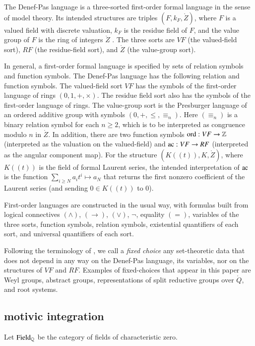 The Denef-Pas language is a three-sorted first-order formal language in the sense of model theory.  
Its intended structures are triples $(F,k_F,\ring{Z})$, 
where $F$ is a valued field with discrete valuation, 
$k_F$ is the residue field of $F$, 
and the value group of $F$ is the ring of integers $\ring{Z}$ . 
The three sorts are $VF$ (the valued-field sort), $RF$ (the residue-field sort), and $\ring{Z}$ (the value-group sort).

In general, a first-order formal language is specified by sets of relation symbols and function symbols.
The Denef-Pas language has the following relation and function symbols.  
The valued-field sort $VF$ has the symbols of the first-order language of rings $(0,1,+,\times)$.  
The residue field sort also has the symbols of the first-order language of rings.  
The value-group sort is the Presburger language of an ordered additive group with symbols $(0,+,\le,\equiv_n)$.  
Here $(\equiv_n)$ is a binary relation symbol for each $n\ge 2$, which is to be interpreted as congruence modulo $n$ in $\ring{Z}$.
In addition, there are two function symbols ${\operatorname{ord}}:VF\to\mathbb{Z}$ (interpreted as the valuation on the valued-field) and ${\operatorname{ac}}:VF\to RF$ 
(interpreted as the angular component map).  
For the structure $(K((t)),K,\ring{Z})$, where $K((t))$ is the field of formal Laurent series, 
the intended interpretation of ${\operatorname{ac}}$ 
is the function $\sum_{i\ge N} a_i t^i\mapsto a_N$ 
that returns the first nonzero coefficient of the Laurent series (and sending $0\in K((t))$ to $0$).

First-order languages are constructed in the usual way, with formulas built from logical connectives $(\land)$, $(\to)$, $(\lor)$, $\neg$, equality
$(=)$, variables of the three sorts, function symbols, relation symbols, existential quantifiers of each sort, and universal quantifiers of each sort.


Following the terminology of \cite{gordon}, we call  a {\it fixed choice} any set-theoretic data that does not depend in any way on the Denef-Pas
language, its variables, nor on the structures of $VF$ and $RF$.   Examples of fixed-choices that appear in this paper are Weyl groups, abstract groups,
representations of split reductive groups over $\ring{Q}$, and root systems.

\subsection{motivic integration}


Let ${\operatorname{Field}}_{\mathbb{Q}}$ be the category of fields of characteristic zero.  

